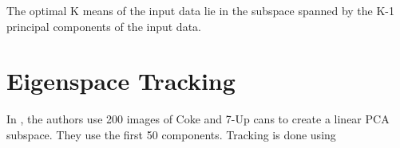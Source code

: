 \documentclass[12pt,letterpaper,doublespaced,ETD]{gt-ece-thesis}
\begin{document}
The optimal K means of the input data lie in the subspace spanned by the K-1 principal components of the input data.


\newpage
\section{Eigenspace Tracking}
In \cite{1998_JNL_Eigentracking_Black}, the authors use 200 images of Coke and 7-Up cans to create a linear PCA subspace.  They use the first 50 components.  Tracking is done using 




\end{document}
